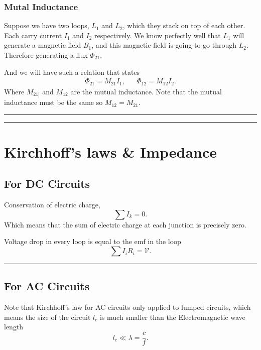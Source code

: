\documentclass[12pt,english]{article}
\numberwithin{equation}{subsection}
\begin{document}
\subsubsection{Mutal Inductance}
Suppose we have two loops, $L_1$ and $L_2$, which they stack on top of each other. Each carry current $I_1$ and $I_2$ respectively. We know perfectly well that $L_1$ will generate a magnetic field $B_1$, and this magnetic field is going to go through $L_2$. Therefore generating a flux $\Phi_{21}$.

And we will have such a relation that states
\begin{align*}
    \Phi_{21} = M_{21} I_{1}, && \Phi_{12} = M_{12} I_{2}.
\end{align*}
Where $M_{21]}$ and $M_{12}$ are the mutual inductance. Note that the mutual inductance must be the same so $M_{12} = M_{21}$.

\par\noindent\rule{\textwidth}{0.4pt}
\par\noindent\rule{\textwidth}{0.4pt}

\section{Kirchhoff's laws \& Impedance}

\subsection{For DC Circuits}
Conservation of electric charge,
\begin{equation}
    \sum I_k = 0.
\end{equation}
Which means that the sum of electric charge at each junction is precisely zero.

Voltage drop in every loop is equal to the emf in the loop
\begin{equation}
    \sum I_i R_i  = \mathcal{V}.
\end{equation}
\par\noindent\rule{\textwidth}{0.4pt}
\subsection{For AC Circuits}
Note that Kirchhoff's law for AC circuits only applied to lumped circuits, which means the size of the circuit $l_c$ is much smaller than the Electromagnetic wave length
\begin{equation}
    l_c \ll \lambda = \frac{c}{f}.
\end{equation}
\end{document}
